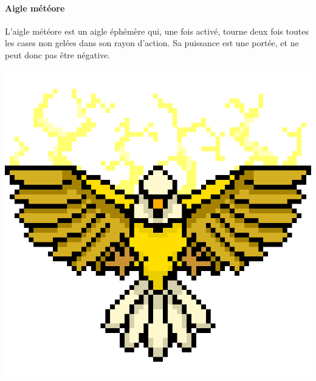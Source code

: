 \begin{minipage}{.75\textwidth}
    \paragraph{Aigle météore}
    L'aigle météore est un aigle éphémère qui, une fois activé, tourne deux fois
    toutes les cases non gelées dans son rayon d'action.
    Sa puissance est une portée, et ne peut donc pas être négative.
\end{minipage}
\begin{minipage}{.2\textwidth}
    \centering
    \includegraphics[width=.8\textwidth]{img/sprites/aigle_meteore.png}
\end{minipage}

